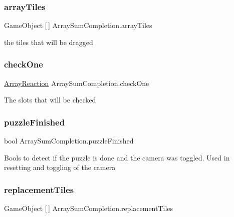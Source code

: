 \subsubsection{\texorpdfstring{array\+Tiles}{arrayTiles}}
{\footnotesize\ttfamily Game\+Object \mbox{[}$\,$\mbox{]} Array\+Sum\+Completion.\+array\+Tiles}



the tiles that will be dragged 

\mbox{\label{class_array_sum_completion_ac76237e402fcc0e49a59a6e87c5def61}} 
\subsubsection{\texorpdfstring{check\+One}{checkOne}}
{\footnotesize\ttfamily \hyperlink{class_array_reaction}{Array\+Reaction} Array\+Sum\+Completion.\+check\+One}



The slots that will be checked 

\mbox{\label{class_array_sum_completion_acbefffe0c43bbd4cd21cfcf34e0a9b7c}} 
\subsubsection{\texorpdfstring{puzzle\+Finished}{puzzleFinished}}
{\footnotesize\ttfamily bool Array\+Sum\+Completion.\+puzzle\+Finished}



Bools to detect if the puzzle is done and the camera was toggled. Used in resetting and toggling of the camera 

\mbox{\label{class_array_sum_completion_a51878c1ec6f821a4d7adff431b4143d1}} 
\subsubsection{\texorpdfstring{replacement\+Tiles}{replacementTiles}}
{\footnotesize\ttfamily Game\+Object \mbox{[}$\,$\mbox{]} Array\+Sum\+Completion.\+replacement\+Tiles}



